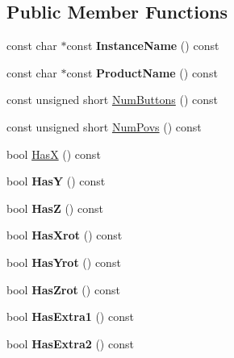 \subsection*{Public Member Functions}
\begin{DoxyCompactItemize}
\item 
\mbox{\label{class_c_joypad_adb568eb312a6aeedce38fcac01168887}} 
const char $\ast$const {\bfseries Instance\+Name} () const
\item 
\mbox{\label{class_c_joypad_ac7570ddc23ec4f06d121acc0508525f4}} 
const char $\ast$const {\bfseries Product\+Name} () const
\item 
const unsigned short \hyperlink{class_c_joypad_ab3a3683d1b12e2071af4751afc2d749c}{Num\+Buttons} () const
\item 
const unsigned short \hyperlink{class_c_joypad_af40e2d5725c3e4d6bdc772e24bb52dca}{Num\+Povs} () const
\item 
bool \hyperlink{class_c_joypad_aad2ba56e14016ef5cd7120b6097caa8c}{HasX} () const
\item 
\mbox{\label{class_c_joypad_a3a2f76474de1417ef6ac54c11bca17e1}} 
bool {\bfseries HasY} () const
\item 
\mbox{\label{class_c_joypad_af7518b10f992af5182eba8e83c803f3a}} 
bool {\bfseries HasZ} () const
\item 
\mbox{\label{class_c_joypad_a04445b0a73ca1d6da9eb15d0e532b41a}} 
bool {\bfseries Has\+Xrot} () const
\item 
\mbox{\label{class_c_joypad_a75ed9276804cd12295d1eafdd7d45c39}} 
bool {\bfseries Has\+Yrot} () const
\item 
\mbox{\label{class_c_joypad_ad5037b8a70da8f60ede0fdaaae3084c7}} 
bool {\bfseries Has\+Zrot} () const
\item 
\mbox{\label{class_c_joypad_a684cacc81bfe813f03d19b13b60dcf71}} 
bool {\bfseries Has\+Extra1} () const
\item 
\mbox{\label{class_c_joypad_a4c4b332957d7871a09a214c5d1b04ff7}} 
bool {\bfseries Has\+Extra2} () const

\end{DoxyCompactItemize}
